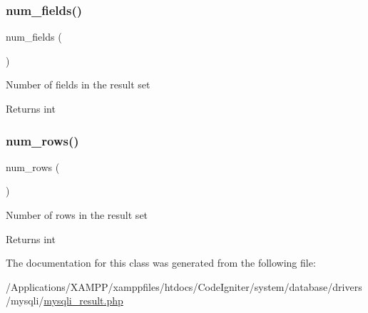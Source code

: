 \subsubsection{\texorpdfstring{num\+\_\+fields()}{num\_fields()}}
{\footnotesize\ttfamily num\+\_\+fields (\begin{DoxyParamCaption}{ }\end{DoxyParamCaption})}

Number of fields in the result set

\begin{DoxyReturn}{Returns}
int 
\end{DoxyReturn}
\mbox{\label{class_c_i___d_b__mysqli__result_a218657c303ee499b97710ab0cd2f5d6e}} 
\subsubsection{\texorpdfstring{num\+\_\+rows()}{num\_rows()}}
{\footnotesize\ttfamily num\+\_\+rows (\begin{DoxyParamCaption}{ }\end{DoxyParamCaption})}

Number of rows in the result set

\begin{DoxyReturn}{Returns}
int 
\end{DoxyReturn}


The documentation for this class was generated from the following file\+:\begin{DoxyCompactItemize}
\item 
/\+Applications/\+X\+A\+M\+P\+P/xamppfiles/htdocs/\+Code\+Igniter/system/database/drivers/mysqli/\mbox{\hyperlink{mysqli__result_8php}{mysqli\+\_\+result.\+php}}\end{DoxyCompactItemize}
